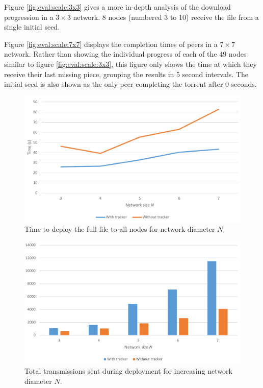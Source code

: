 Figure \ref{fig:eval:scale:3x3} gives a more in-depth analysis of the download progression in a $3 \times 3$ network. 8 nodes (numbered 3 to 10) receive the file from a single initial seed.

Figure \ref{fig:eval:scale:7x7} displays the completion times of peers in a $7 \times 7$ network. Rather than showing the individual progress of each of the 49 nodes similar to figure \ref{fig:eval:scale:3x3}, this figure only shows the time at which they receive their last missing piece, grouping the results in 5 second intervals. The initial seed is also shown as the only peer completing the torrent after 0 seconds.

\begin{figure}
    \centering
    \includegraphics[width=\textwidth]{graphs/scale/deploy-time.pdf}
    \caption[Deployment times for increasing network diameter]{Time to deploy the full file to all nodes for network diameter $N$.}
    \label{fig:eval:scale:deploy-time}
\end{figure}

\begin{figure}
    \centering
    \includegraphics[width=\textwidth]{graphs/scale/total-transmissions.pdf}
    \caption[Total transmissions for increasing network diameter]{Total transmissions sent during deployment for increasing network diameter $N$.}
    \label{fig:eval:scale:total-transmissions}
\end{figure}

